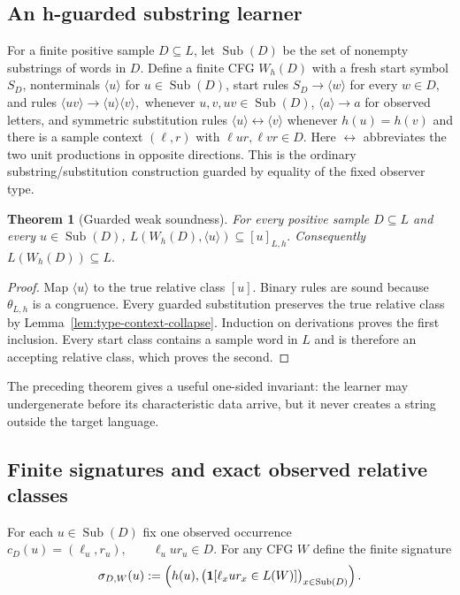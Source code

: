 \documentclass[11pt,a4paper]{article}
\newtheorem{theorem}{Theorem}[section]
\begin{document}
\subsection{An h-guarded substring learner}

For a finite positive sample $D\subseteq L$, let $\operatorname{Sub}(D)$ be the set of nonempty substrings of words in $D$.  Define a finite CFG $W_h(D)$ with a fresh start symbol $S_D$, nonterminals $\langle u\rangle$ for $u\in\operatorname{Sub}(D)$, start rules
\(S_D\to\langle w\rangle\)
for every $w\in D$, and rules
\(\langle uv\rangle\to\langle u\rangle\langle v\rangle,\)
whenever $u,v,uv\in\operatorname{Sub}(D)$,
\(\langle a\rangle\to a\)
for observed letters, and symmetric substitution rules
\(\langle u\rangle\leftrightarrow\langle v\rangle\)
whenever
\(h(u)=h(v)\)
and there is a sample context $(\ell,r)$ with
\(\ell ur,\ell vr\in D.\)
Here $\leftrightarrow$ abbreviates the two unit productions in opposite directions.  This is the ordinary substring/substitution construction guarded by equality of the fixed observer type.

\begin{theorem}[Guarded weak soundness]
\label{thm:weak-sound}
For every positive sample $D\subseteq L$ and every $u\in\operatorname{Sub}(D)$,
\(L(W_h(D),\langle u\rangle)\subseteq[u]_{L,h}.\)
Consequently
\(L(W_h(D))\subseteq L.\)
\end{theorem}

\begin{proof}
Map $\langle u\rangle$ to the true relative class $[u]$.  Binary rules are sound because $\theta_{L,h}$ is a congruence.  Every guarded substitution preserves the true relative class by Lemma~\ref{lem:type-context-collapse}.  Induction on derivations proves the first inclusion.  Every start class contains a sample word in $L$ and is therefore an accepting relative class, which proves the second.
\end{proof}

The preceding theorem gives a useful one-sided invariant: the learner may undergenerate before its characteristic data arrive, but it never creates a string outside the target language.

\subsection{Finite signatures and exact observed relative classes}

For each $u\in\operatorname{Sub}(D)$ fix one observed occurrence
\(c_D(u)=(\ell_u,r_u), \qquad \ell_u u r_u\in D.\)
For any CFG $W$ define the finite signature
\[
  \sigma_{D,W}(u)
  :=
  \left(
    h(u),
    \bigl(
      {\bf1}[\ell_xur_x\in L(W)]
    \bigr)_{x\in\operatorname{Sub}(D)}
  \right).
\]
\end{document}
